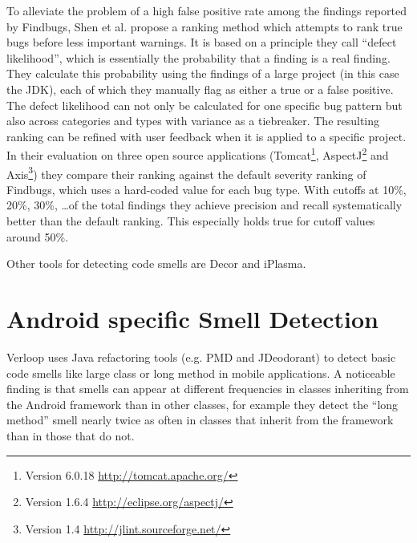 To alleviate the problem of a high false positive rate among the findings reported by Findbugs, Shen et al. \cite{shen2011efindbugs} propose a ranking method which attempts to rank true bugs before less important warnings.
It is based on a principle they call ``defect likelihood'', which is essentially the probability that a finding is a real finding.
They calculate this probability using the findings of a large project (in this case the JDK), each of which they manually flag as either a true or a false positive.
The defect likelihood can not only be calculated for one specific bug pattern but also across categories and types with variance as a tiebreaker.
The resulting ranking can be refined with user feedback when it is applied to a specific project.
In their evaluation on three open source applications
(Tomcat\footnote{Version 6.0.18 \url{http://tomcat.apache.org/}}, AspectJ\footnote{Version 1.6.4 \url{http://eclipse.org/aspectj/}} and Axis\footnote{Version 1.4 \url{http://jlint.sourceforge.net/}})
they compare their ranking against the default severity ranking of Findbugs, which uses a hard-coded value for each bug type.
With cutoffs at 10\%, 20\%, 30\%, \ldots of the total findings they achieve precision and recall systematically better than the default ranking.
This especially holds true for cutoff values around 50\%.


Other tools for detecting code smells are Decor\cite{moha2010decor} and iPlasma\cite{Marinescu2005iPlasmaAI}.

\section{Android specific Smell Detection}


Verloop \cite{verloop2013code} uses Java refactoring tools (e.g. PMD and JDeodorant) to detect basic code smells like large class or long method in mobile applications.
A noticeable finding is that smells can appear at different frequencies in classes inheriting from the Android framework than in other classes, for example
they detect the ``long method'' smell nearly twice as often in classes that inherit from the framework than in those that do not.

